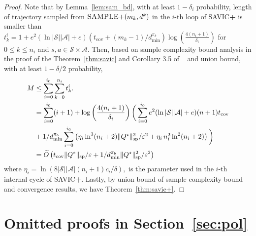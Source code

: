 \documentclass{article}
\theoremstyle{definition}
\theoremstyle{remark}
\newcommand{\cA}{\mathcal{A}}
\newcommand{\cS}{\mathcal{S}}
\renewcommand{\sp}[1]{\|{#1}\|_\text{\rm sp}}
\begin{document}
\begin{proof}
 
Note that by Lemma~\ref{lem:sam_bd}, with at least $1-\delta_i$ probability,
length of trajectory sampled from $\mbox{\sc SAMPLE+}( m_k, d^k)$ in the $i$-th loop of  \mbox{\rm SAVIC\textbf{+}} is smaller than $ t_k^i=1+e^2( \ln|\cS||\cA|+e)( t_{\mathrm{cov}}+(m_k-1)/d^{\pi_b}_{\mathrm{min}})\log \left(\frac{4(n_i+1)}{\delta_i }\right)$ for $0\le k\le n_i$ and $s,a \in \cS \times \cA$.  Then, based on sample complexity bound analysis in the proof of the Theorem~\ref{thm:savic} and Corollary 3.5 of ~\cite{lee2025near} and union bound,  with at least $1-\delta/2$ probability, 
\begin{align*}
M&\leq
\sum^{i_0}_{i=0}\sum^{n_i}_{k=0} t_k^i.
\\&=\sum^{i_0}_{i=0}(i+1)+\log \left(\frac{4(n_i+1)}{\delta_i }\right) \bigg(\sum^{i_0}_{i=0}e^2( \ln|\cS||\cA|+e)(n+1)t_{\mathrm{cov}}\\&+ 1/d^{\pi_b}_{\mathrm{min}}\sum^{i_0}_{i=0}\left( \mbox{$\eta_i\ln^3(n_i+2)\sp{Q^\star}^2/\varepsilon^{2}+\eta_i\,n_i^2\ln^2(n_i+2)$}\right)\bigg)
\\&=\widetilde{O}\left(t_{\mathrm{cov}}\sp{Q^{*}}/\varepsilon + 1/d^{\pi_b}_{\mathrm{min}}\sp{Q^\star}^2/\varepsilon^2\right)
\end{align*}
where $\eta_i= \ln(8|\cS||\cA|(n_i\!+\!1)c_i/\delta),$ 
is the parameter used in the $i$-th internal cycle of \mbox{\rm SAVIC\textbf{+}}. Lastly, by union bound of sample complexity bound and convergence results, we have Theorem~\ref{thm:savic+}.

\end{proof}





\section{Omitted proofs in Section~\ref{sec:pol}}\label{omit:sec:4}
\end{document}
